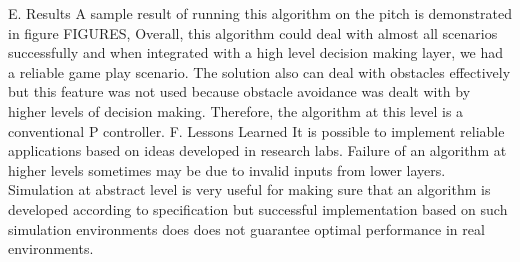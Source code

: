 E. Results
A sample result of running this algorithm on the pitch is demonstrated in figure FIGURES, Overall, this algorithm could deal with almost all scenarios successfully and when integrated with a high level decision making layer, we had a reliable game play scenario. 
The solution also can deal with obstacles effectively but this feature was not used because obstacle avoidance was dealt with by higher levels of decision making. Therefore, the algorithm at this level is a conventional P controller.  
F. Lessons Learned
It is possible to implement reliable applications based on ideas developed in research labs. 
Failure of an algorithm at higher levels sometimes may be due to invalid inputs from lower layers.
Simulation at abstract level is very useful for making sure that an algorithm is developed according to specification but successful implementation based on such simulation environments does does not guarantee optimal performance in real environments.
